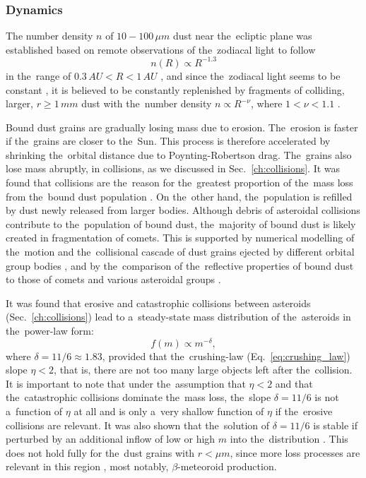 \subsubsection{Dynamics}

The number density $n$ of $10 - 100 \, \si{\mu m}$ dust near the~ecliptic plane was established based on remote observations of the~zodiacal light to follow 
\begin{equation}
    n(R) \propto R^{-1.3} \label{eq:dust_number_density}
\end{equation}
in the~range of $0.3 \, \si{AU} < R < 1 \, \si{AU}$ \citep{leinert1981zodiacal}, and since the~zodiacal light seems to be constant \citep{buffington2016measurements}, it is believed to be constantly replenished by fragments of colliding, larger, $r \geq 1 \, \si{mm}$ dust with the~number density $n \propto R^{-\nu}$, where $1 < \nu < 1.1$ \citep{leinert1983maintain}.

Bound dust grains are gradually losing mass due to erosion. The~erosion is faster if the~grains are closer to the~Sun. This process is therefore accelerated by shrinking the~orbital distance due to Poynting-Robertson drag. The~grains also lose mass abruptly, in collisions, as we discussed in Sec.~\ref{ch:collisions}. It was found that collisions are the~reason for the~greatest proportion of the~mass loss from the~bound dust population \citep{grun1985collisional}. On the~other hand, the~population is refilled by dust newly released from larger bodies. Although debris of asteroidal collisions contribute to the~population of bound dust, the~majority of bound dust is likely created in fragmentation of comets. This is supported by numerical modelling of the~motion and the~collisional cascade of dust grains ejected by different orbital group bodies \citep{nesvorny2010cometary}, and by the~comparison of the~reflective properties of bound dust to those of comets and various asteroidal groups \citep{yang2015origin}. 

It was found \citep{dohnanyi1969collisional} that erosive and catastrophic collisions between asteroids (Sec.~\ref{ch:collisions}) lead to a~steady-state mass distribution of the~asteroids in the~power-law form: 
\begin{equation}
    f(m) \propto m^{-\delta}, \label{eq:mass_distribution}
\end{equation}
where $\delta = 11/6 \approx 1.83$, provided that the~crushing-law (Eq.~\ref{eq:crushing_law}) slope $\eta < 2$, that is, there are not too many large objects left after the~collision. It is important to note that under the~assumption that $\eta < 2$ and that the~catastrophic collisions dominate the~mass loss, the~slope $\delta = 11/6$ is not a~function of $\eta$ at all and is only a~very shallow function of $\eta$ if the~erosive collisions are relevant. It was also shown that the~solution of $\delta = 11/6$ is stable if perturbed by an additional inflow of low or high $m$ into the~distribution \citep{dohnanyi1969collisional}. This does not hold fully for the~dust grains with $r < \si{\mu m}$, since more loss processes are relevant in this region \citep{grun1985collisional}, most notably, $\beta$-meteoroid production.

